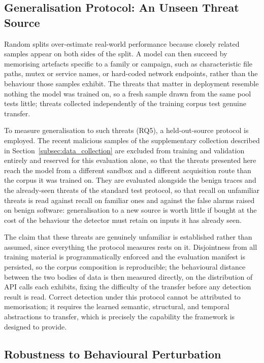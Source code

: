 \documentclass[%
    BCOR=10mm,
    DIV=13,
    toc=bibliography,
    toc=listof,
    oneside,
    12pt,
]{scrbook}
\begin{document}
\subsection{Generalisation Protocol: An Unseen Threat Source}
\label{subsec:lofo}

Random splits over-estimate real-world performance because closely related
samples appear on both sides of the split. A model can then succeed by
memorising artefacts specific to a family or campaign, such as characteristic
file paths, mutex or service names, or hard-coded network endpoints, rather than
the behaviour those samples exhibit. The threats that matter in deployment
resemble nothing the model was trained on, so a fresh sample drawn from the same
pool tests little; threats collected independently of the training corpus test
genuine transfer.

To measure generalisation to such threats (RQ5), a held-out-source protocol is
employed. The recent malicious samples of the supplementary collection described
in Section~\ref{subsec:data_collection} are excluded from training and
validation entirely and reserved for this evaluation alone, so that the threats
presented here reach the model from a different sandbox and a different
acquisition route than the corpus it was trained on. They are evaluated
alongside the benign traces and the already-seen threats of the standard test
protocol, so that
recall on unfamiliar threats is read against recall on familiar ones and against
the false alarms raised on benign software: generalisation to a new source is
worth little if bought at the cost of the behaviour the detector must retain on
inputs it has already seen.

The claim that these threats are genuinely unfamiliar is established rather than
assumed, since everything the protocol measures rests on it. Disjointness from
all training material is programmatically enforced and the evaluation manifest
is persisted, so the corpus composition is reproducible; the behavioural
distance between the two bodies of data is then measured directly, on the
distribution of API calls each exhibits, fixing the difficulty of the transfer
before any detection result is read. Correct detection under this protocol
cannot be attributed to memorisation; it requires the learned semantic,
structural, and temporal abstractions to transfer, which is precisely the
capability the framework is designed to provide.

\subsection{Robustness to Behavioural Perturbation}
\label{subsec:robustness_eval}
\end{document}
